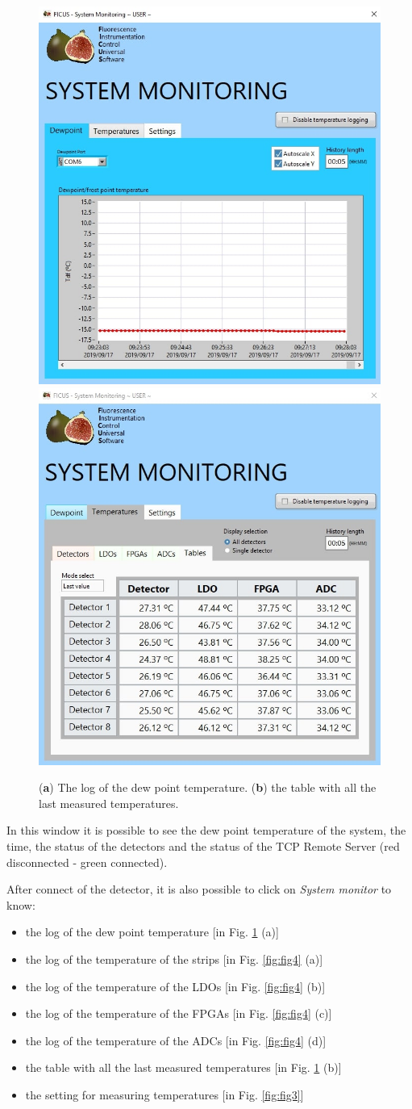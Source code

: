 \documentclass[a4paper,12pt,oneside,pdflatex,italian,final,twocolumn]{article}
\begin{document}
\begin{figure}[h]
\centering
\subfloat
{\includegraphics[width=.42\textwidth]{Capture15.jpg}} \quad
\subfloat
{\includegraphics[width=.42\textwidth]{Capture19.jpg}} \\

\caption{(\textbf{a}) The log of the dew point temperature. (\textbf{b}) the table with all the last measured temperatures.}\label{fig:fig2}
\end{figure}

In this window it is possible to see the dew point temperature of the system, the time, the status of the detectors and the status of the TCP Remote Server (red disconnected - green connected). 

After connect of the detector, it is also possible to click on \textit{System monitor} to know: 
\begin{itemize}
    \item the log of the dew point temperature [in Fig. \ref{fig:fig2} (a)]
    \item the log of the temperature of the strips [in Fig. \ref{fig:fig4} (a)]
    \item the log of the temperature of the LDOs [in Fig. \ref{fig:fig4} (b)]
    \item the log of the temperature of the FPGAs [in Fig. \ref{fig:fig4} (c)]
    \item the log of the temperature of the ADCs [in Fig. \ref{fig:fig4} (d)]
    \item the table with all the last measured temperatures [in Fig. \ref{fig:fig2} (b)]
    \item the setting for measuring temperatures [in Fig. \ref{fig:fig3}]
\end{itemize}
\end{document}
